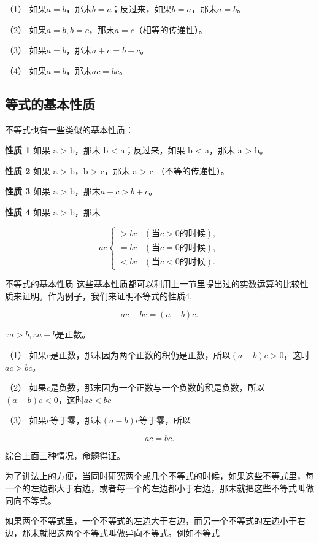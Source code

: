 （1）
如果\(a = b\)，那末\(b = a\)；反过来，如果\(b = a\)，那末\(a = b\)。

（2） 如果\(a = b, b = c\)，那末\(a = c\)（相等的传递性）。

（3） 如果\(a = b\)，那末\(a + c = b + c\)。

（4） 如果\(a = b\)，那末\(ac = bc\)。

\subsection{等式的基本性质}

不等式也有一些类似的基本性质：

\textbf{性质 1} 如果 a \textgreater{} b，那末 b \textless{}
a；反过来，如果 b \textless{} a，那末 a \textgreater{} b。

\textbf{性质 2} 如果 a \textgreater{} b，b \textgreater{} c，那末 a
\textgreater{} c （不等的传递性）。

\textbf{性质 3} 如果 a \textgreater{} b，那末\(a + c > b + c\)。

\textbf{性质 4} 如果 a \textgreater{} b，那末

\[
a c \left\{ \begin{array}{ll} > b c & (\text{当} c > 0 \text{的时候}), \\ = b c & (\text{当} c = 0 \text{的时候}), \\ < b c & (\text{当} c < 0 \text{的时候}). \end{array} \right.
\]

不等式的基本性质
这些基本性质都可以利用上一节里提出过的实数运算的比较性质来证明。作为例子，我们来证明不等式的性质4.

\[
a c - b c = (a - b) c.
\]

\(\because a > b, \therefore a - b\)是正数。

（1）
如果\(c\)是正数，那末因为两个正数的积仍是正数，所以\((a - b)c > 0\)，这时\(ac > bc\)。

（2）
如果\(c\)是负数，那末因为一个正数与一个负数的积是负数，所以\((a - b)c < 0\)，这时\(ac < bc\)

（3） 如果\(c\)等于零，那末\((a - b)c\)等于零，所以

\[
a c = b c.
\]

综合上面三种情况，命题得证。

为了讲法上的方便，当同时研究两个或几个不等式的时候，如果这些不等式里，每一个的左边都大于右边，或者每一个的左边都小于右边，那末就把这些不等式叫做同向不等式。

如果两个不等式里，一个不等式的左边大于右边，而另一个不等式的左边小于右边，那末就把这两个不等式叫做异向不等式。例如不等式


